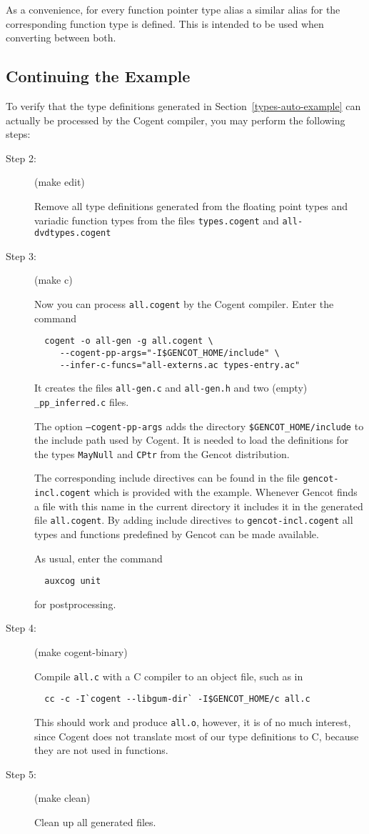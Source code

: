 \documentclass[a4paper]{report}
\newcommand{\code}[1]{\textnormal{\texttt{#1}}}
\begin{document}
As a convenience, for every function pointer type alias a similar alias for the corresponding function type is 
defined. This is intended to be used when converting between both.

\subsection{Continuing the Example}

To verify that the type definitions generated in Section~\ref{types-auto-example} can actually be processed by the 
Cogent compiler, you may perform the following steps:

\begin{description}
\item[Step 2:] (make edit)

Remove all type definitions generated from the floating point types and variadic function types 
from the files \code{types.cogent} and \code{all-dvdtypes.cogent}

\item[Step 3:] (make c)

Now you can process \code{all.cogent} by the Cogent compiler. Enter the command
\begin{verbatim}
  cogent -o all-gen -g all.cogent \
     --cogent-pp-args="-I$GENCOT_HOME/include" \
     --infer-c-funcs="all-externs.ac types-entry.ac"
\end{verbatim}
It creates the files \code{all-gen.c} and \code{all-gen.h} and two (empty) \code{\_pp\_inferred.c} files. 

The option \code{--cogent-pp-args} adds the directory \code{\$GENCOT\_HOME/include} to the include path
used by Cogent. It is needed to load the definitions for the types \code{MayNull} and \code{CPtr} from
the Gencot distribution. 

The corresponding include directives can be found in the file \code{gencot-incl.cogent}
which is provided with the example. Whenever Gencot finds a file with this name in the current directory it 
includes it in the generated file \code{all.cogent}. By adding include directives to \code{gencot-incl.cogent}
all types and functions predefined by Gencot can be made available.

As usual, enter the command
\begin{verbatim}
  auxcog unit
\end{verbatim}
for postprocessing.

\item[Step 4:] (make cogent-binary)

Compile \code{all.c} with a C compiler to an object file, such as in 
\begin{verbatim}
  cc -c -I`cogent --libgum-dir` -I$GENCOT_HOME/c all.c
\end{verbatim}
This should work and produce \code{all.o}, however, it is of no much interest,
since Cogent does not translate most of our type definitions to C, because they are not used in functions.

\item[Step 5:] (make clean)

Clean up all generated files.
\end{description}
\end{document}
